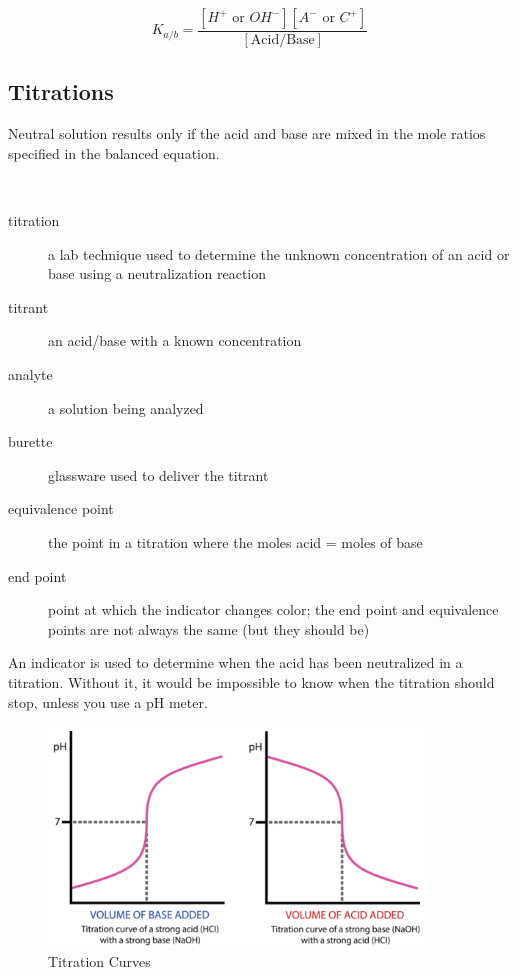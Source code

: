 \documentclass[11pt]{article}
\begin{document}
    \begin{center}
    \end{center}
    \begin{equation*}
        K_{a/b} = \frac{[H^{+} \text{ or } OH^{-}][A^{-} \text{ or } C^{+}]}{[\text{Acid/Base}]}
    \end{equation*}

    \subsection{Titrations}
    Neutral solution results only if the acid and base are mixed in the mole ratios specified in the balanced equation.
    \begin{center}
         \\
    \end{center}

    \begin{description}
        \item[titration] a lab technique used to determine the unknown concentration of an acid or base using a neutralization reaction
        \item[titrant] an acid/base with a known concentration
        \item[analyte] a solution being analyzed
        \item[burette] glassware used to deliver the titrant
        \item[equivalence point] the point in a titration where the moles acid = moles of base
        \item[end point] point at which the indicator changes color; the end point and equivalence points are not always the same (but they should be)   
    \end{description}

    An indicator is used to determine when the acid has been neutralized in a titration. Without it, it would be impossible to know when the titration should stop, unless you use a pH meter.

    \begin{figure}[h]
        \begin{center}
            \includegraphics[width=10cm]{ph_curves}
            \caption{Titration Curves}
            \end{center}
    \end{figure}
\end{document}
